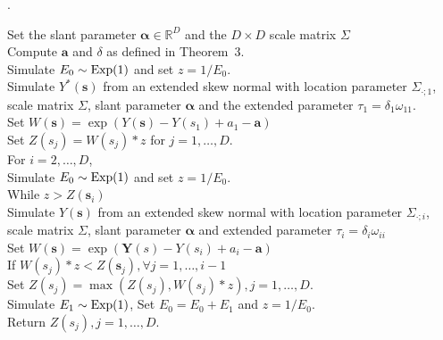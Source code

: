 \documentclass[12pt]{article}
\begin{document}
\begin{algorithm}
\caption{Exact simulation from the skewed Brown-Resnick process at location $s_i,i=1,\dots,D$}.
\label{algo:log_skew_normal}
\begin{tabbing}
    \qquad \enspace Set the slant parameter $\bm \alpha \in \mathbb{R}^D$ and the $D \times D$ scale matrix $\Sigma$ \\
    \qquad \enspace Compute $\bm a$ and $\delta$ as defined in Theorem~3.\\
    \qquad \enspace Simulate $E_0 \sim \rm{Exp}(1)$ and set $z=1/E_0$.\\    
    \qquad \enspace Simulate $Y^*(\bm s)$ from an extended skew normal with location parameter $\Sigma_{\cdot;1}$,\\
    \qquad \enspace scale matrix $\Sigma$, slant parameter $\bm \alpha$ and the extended parameter $\tau_1=\delta_1 \omega_{11}$.\\
    \qquad \enspace Set $W(\bm s) = \exp(Y(\bm s)-Y(s_1)+a_1 - \bm a)$ \\
    \qquad \enspace Set $Z(s_j)=W(s_j)*z$ for $j=1,\dots,D$. \\
    \qquad \enspace For {$i=2,\dots,D$}, \\
    \qquad \qquad \enspace Simulate $E_0 \sim \rm{Exp}(1)$ and set $z=1/E_0$. \\
    \qquad \qquad \enspace While {$z > Z(\bm s_i)$} \\
    \qquad \qquad \qquad \enspace Simulate $Y(\bm s)$ from an extended skew normal with location parameter $\Sigma_{\cdot;i}$, \\
    \qquad \qquad \qquad \enspace scale matrix $\Sigma$, slant parameter $\bm \alpha$ and extended parameter $\tau_i=\delta_i\omega_{ii}$ \\
    \qquad \qquad \qquad \enspace Set $W(\bm s) = \exp(\bm Y(s)-Y(s_i)+a_i - \bm a)$ \\
    \qquad \qquad \qquad \enspace  If {$W(s_{j})*z < Z(\bm s_j), \forall j=1,\dots,i-1$} \\
    \qquad \qquad \qquad \qquad \enspace Set $Z(s_j)=\max(Z(s_j),W(s_j)*z),j=1,\dots,D$. \\
    \qquad \qquad \qquad \enspace Simulate $E_1 \sim \rm{Exp}(1)$, Set $E_0 = E_0 + E_1$ and $z=1/E_0$. \\
    \qquad \enspace Return $Z(s_j),j=1,\dots,D$.
\end{tabbing}
\end{algorithm}

\newpage 
\end{document}

